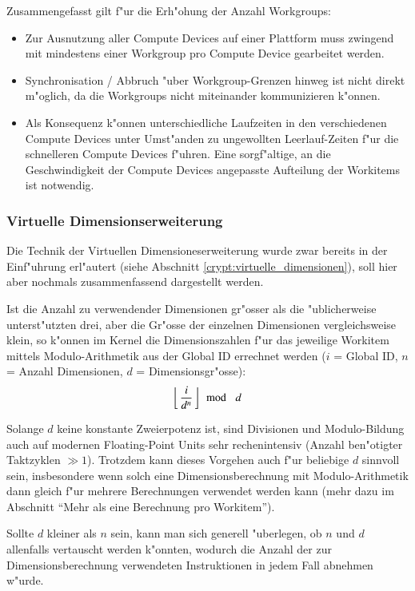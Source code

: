 \begin{refsection}
Zusammengefasst gilt f"ur die Erh"ohung der Anzahl Workgroups:

\begin{itemize}
 \item Zur Ausnutzung aller Compute Devices auf einer Plattform
       muss zwingend mit mindestens einer Workgroup pro Compute Device
       gearbeitet werden.
 \item Synchronisation / Abbruch "uber Workgroup-Grenzen hinweg ist 
       nicht direkt m"oglich, da die Workgroups nicht miteinander kommunizieren
			 k"onnen.
 \item Als Konsequenz k"onnen unterschiedliche Laufzeiten in den verschiedenen
			 Compute Devices unter Umst"anden zu ungewollten Leerlauf-Zeiten f"ur die
			 schnelleren Compute Devices f"uhren. Eine sorgf"altige, an die
			 Geschwindigkeit der Compute Devices angepasste Aufteilung der Workitems ist
			 notwendig.
\end{itemize}

\subsubsection{Virtuelle Dimensionserweiterung}

Die Technik der Virtuellen Dimensioneserweiterung wurde zwar bereits in der
Einf"uhrung erl"autert (siehe Abschnitt \ref{crypt:virtuelle_dimensionen}), soll
hier aber nochmals zusammenfassend dargestellt werden.

Ist die Anzahl zu verwendender Dimensionen gr"osser als die "ublicherweise
unterst"utzten drei, aber die Gr"osse der einzelnen Dimensionen vergleichsweise
klein, so k"onnen im Kernel die Dimensionszahlen f"ur das jeweilige Workitem
mittels Modulo-Arithmetik aus der Global ID errechnet werden ($i$ = Global ID,
$n$ = Anzahl  Dimensionen, $d$ = Dimensionsgr"osse):
\[
	\left\lfloor\,\frac{i}{d^n}\,\right\rfloor\! \mod\enskip d
\]

Solange $d$ keine konstante Zweierpotenz ist, sind Divisionen und Modulo-Bildung
auch auf modernen Floating-Point Units sehr rechenintensiv (Anzahl ben"otigter
Taktzyklen $ \gg 1 $). Trotzdem kann dieses Vorgehen auch f"ur beliebige $d$
sinnvoll sein, insbesondere wenn solch eine Dimensionsberechnung mit
Modulo-Arithmetik dann gleich f"ur mehrere Berechnungen verwendet werden kann
(mehr dazu im Abschnitt ``Mehr als eine Berechnung pro Workitem'').

Sollte $d$ kleiner als $n$ sein, kann man sich generell "uberlegen, ob $n$ und
$d$ allenfalls vertauscht werden k"onnten, wodurch die Anzahl der zur
Dimensionsberechnung verwendeten Instruktionen in jedem Fall abnehmen w"urde.


\end{refsection}
